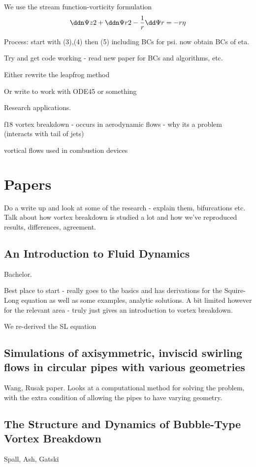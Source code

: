 \documentclass{X:/Documents/Coding/Latex/myreport}
\begin{document}
We use the stream function-vorticity formulation
\[\ddn \Psi z2 + \ddn \Psi r2 - \frac1r \dd \Psi r = -r \eta\]


Process: start with (3),(4) then (5) including BCs for psi. now obtain BCs of eta.

Try and get code working - read new paper for BCs and algorithms, etc.

Either rewrite the leapfrog method

Or write to work with ODE45 or something



Research applications.

f18 vortex breakdown - occurs in aerodynamic flows - why its a problem (interacts with tail of jets)

vortical flows used in combustion devices




\section{Papers}


Do a write up and look at some of the research - explain them, bifurcations etc.
Talk about how vortex breakdown is studied a lot and how we've reproduced results, differences, agreement.


\subsection{An Introduction to Fluid Dynamics}
Bachelor.

Best place to start - really goes to the basics and has derivations for the Squire-Long equation as well as some examples, analytic solutions.
A bit limited however for the relevant area - truly just gives an introduction to vortex breakdown.

We re-derived the SL equation

\subsection{Simulations of axisymmetric, inviscid swirling flows in circular pipes with various geometries}
Wang, Rusak paper.
Looks at a computational method for solving the problem, with the extra condition of allowing the pipes to have varying geometry.



\subsection{The Structure and Dynamics of Bubble-Type Vortex Breakdown}
Spall, Ash, Gatski
\end{document}
